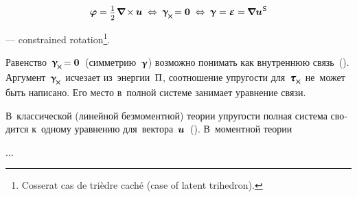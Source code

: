 \nopagebreak\vspace{-0.15em}\begin{equation}
\fieldofrotations = \smalldisplaystyleonehalf \hspace{.2ex} \boldnabla \hspace{-0.16ex} \times \hspace{-0.1ex} \fieldofdisplacements
\hspace{.6ex}\Leftrightarrow\hspace{.6ex}
\distortiontensor_{\hspace{-0.25ex}\Xcompanion} \hspace{-0.32ex} = \bm{0}
\hspace{.6ex}\Leftrightarrow\hspace{.6ex}
\distortiontensor = \infinitesimaldeformation = \hspace{-0.12ex} \boldnabla {\fieldofdisplacements}^{\hspace{.1ex}\mathsf{S}}
\end{equation}

\vspace{-0.2em}\noindent
---  constrained rotation\ru{)}\footnote{Cosserat  cas de trièdre caché (case of latent trihedron).}\hspace{-0.32em}.

\begin{otherlanguage}{russian}

Равенство~${\distortiontensor_{\hspace{-0.25ex}\Xcompanion} \hspace{-0.32ex} = \bm{0}}$~(симметрию~$\bm{\upgamma}$) возможно понимать как внутреннюю связь~().
Аргумент~${\distortiontensor_{\hspace{-0.25ex}\Xcompanion}}$ исчезает из~энергии~$\Pi$, соотношение упругости для~${\forcestresstensor_{\hspace{-0.1ex}\Xcompanion}}$ не~может быть написано.
Его место в~полной системе занимает уравнение связи.

В~классической (линейной безмоментной) теории упругости полная система сводится к~одному уравнению для~вектора~$\bm{u}$~().
В~моментной теории

...



\end{otherlanguage}

